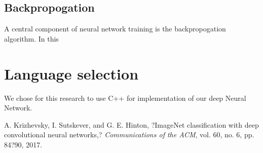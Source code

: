 \documentclass{article}
\begin{document}
\subsection{Backpropogation}
A central component of neural network training is the backpropogation algorithm. In this 

\section{Language selection}
We chose for this research to use C++ for implementation of our deep Neural Network.

\begin{thebibliography}

	A. Krizhevsky, I. Sutskever, and G. E. Hinton, ?ImageNet classification with deep convolutional neural networks,? \textit{Communications of the ACM}, vol. 60, no. 6, pp. 84?90, 2017.

\end{thebibliography}
\end{document}
